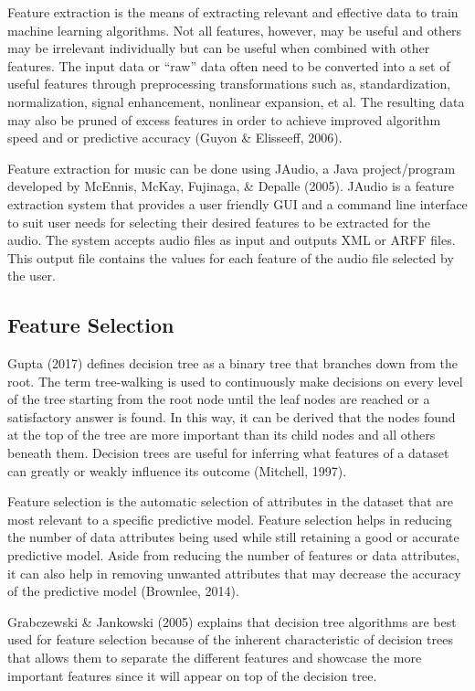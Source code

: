 Feature extraction is the means of extracting relevant and effective data to train machine learning algorithms. Not all features, however, may be useful and others may be irrelevant individually but can be useful when combined with other features. The input data or “raw” data often need to be converted into a set of useful features through preprocessing transformations such as, standardization, normalization, signal enhancement, nonlinear expansion, et al. The resulting data may also be pruned of excess features in order to achieve improved algorithm speed and or predictive accuracy (Guyon \& Elisseeff, 2006).


Feature extraction for music can be done using JAudio, a Java project/program developed by McEnnis, McKay, Fujinaga, \& Depalle (2005). JAudio is a feature extraction system that provides a user friendly GUI and a command line interface to suit user needs for selecting their desired features to be extracted for the audio. The system accepts audio files as input and outputs XML or ARFF files. This output file contains the values for each feature of the audio file selected by the user.

\subsection{Feature Selection}

Gupta (2017) defines decision tree as a binary tree that branches down from the root. The term tree-walking is used to continuously make decisions on every level of the tree starting from the root node until the leaf nodes are reached or a satisfactory answer is found. In this way, it can be derived that the nodes found at the top of the tree are more important than its child nodes and all others beneath them. Decision trees are useful for inferring what features of a dataset can greatly or weakly influence its outcome (Mitchell, 1997).

Feature selection is the automatic selection of attributes in the dataset that are most relevant to a specific predictive model. Feature selection helps in reducing the number of data attributes being used while still retaining a good or accurate predictive model. Aside from reducing the number of features or data attributes, it can also help in removing unwanted attributes that may decrease the accuracy of the predictive model (Brownlee, 2014).

Grabczewski \& Jankowski (2005) explains that decision tree algorithms are best used for feature selection because of the inherent characteristic of decision trees that allows them to separate the different features and showcase the more important features since it will appear on top of the decision tree.
	
